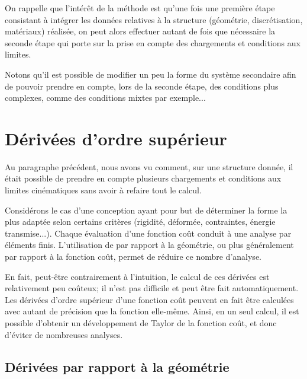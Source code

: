 \bigskip
{}

\medskip
On rappelle que l'intérêt de la méthode est qu'une fois une première étape consistant à intégrer les données relatives à la structure (géométrie, discrétisation, matériaux) réalisée, on peut alors effectuer autant de fois que nécessaire la seconde étape qui porte sur la prise en compte des chargements et conditions aux limites.

Notons qu'il est possible de modifier un peu la forme du système secondaire afin de pouvoir prendre en compte, lors de la seconde étape, des conditions plus complexes, comme des conditions mixtes par exemple...


\medskip
\section{Dérivées d'ordre supérieur}\label{Sec-Deriv}

Au paragraphe précédent, nous avons vu comment, sur une structure donnée, il était possible de prendre en compte plusieurs chargements et conditions aux limites cinématiques sans avoir à refaire tout le calcul.


\medskip
Considérons le cas d'une conception ayant pour but de déterminer la forme la plus adaptée selon certains critères (rigidité, déformée, contraintes, énergie transmise...). Chaque évaluation d'une fonction coût conduit à une analyse par éléments finis. L'utilisation de  par rapport à la géométrie, ou plus généralement par rapport à la fonction coût, permet de réduire ce nombre d'analyse.

En fait, peut-être contrairement à l'intuition, le calcul de ces dérivées est relativement peu coûteux; il n'est pas difficile et peut être fait automatiquement. Les dérivées d'ordre supérieur d'une fonction coût peuvent en fait être calculées avec autant de précision que la fonction elle-même. Ainsi, en un seul calcul, il est possible d'obtenir un développement de Taylor de la fonction coût, et donc d'éviter de nombreuses analyses.

\medskip
\subsection{Dérivées par rapport à la géométrie}

